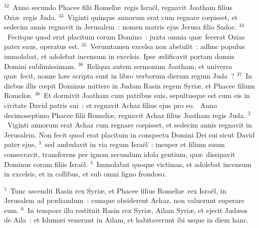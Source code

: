 ${}^{32}$~Anno secundo Phacee filii Romeli\ae\ regis Isra\"el, regnavit Joatham filius Ozi\ae\ regis Juda.
${}^{33}$~Viginti quinque annorum erat cum regnare cœpisset, et sedecim annis regnavit in Jerusalem~: nomen matris ejus Jerusa filia Sadoc.
${}^{34}$~Fecitque quod erat placitum coram Domino~: juxta omnia qu\ae\ fecerat Ozias pater suus, operatus est.
${}^{35}$~Verumtamen excelsa non abstulit~: adhuc populus immolabat, et adolebat incensum in excelsis. Ipse \ae dificavit portam domus Domini sublimissimam.
${}^{36}$~Reliqua autem sermonum Joatham, et universa qu\ae\ fecit, nonne h\ae c scripta sunt in libro verborum dierum regum Juda~?
${}^{37}$~In diebus illis cœpit Dominus mittere in Judam Rasin regem Syri\ae , et Phacee filium Romeli\ae .
${}^{38}$~Et dormivit Joatham cum patribus suis, sepultusque est cum eis in civitate David patris sui~: et regnavit Achaz filius ejus pro eo.
~Anno decimoseptimo Phacee filii Romeli\ae , regnavit Achaz filius Joatham regis Juda.
${}^{2}$~Viginti annorum erat Achaz cum regnare cœpisset, et sedecim annis regnavit in Jerusalem. Non fecit quod erat placitum in conspectu Domini Dei sui sicut David pater ejus,
${}^{3}$~sed ambulavit in via regum Isra\"el~: insuper et filium suum consecravit, transferens per ignem secundum idola gentium, qu\ae\ dissipavit Dominus coram filiis Isra\"el.
${}^{4}$~Immolabat quoque victimas, et adolebat incensum in excelsis, et in collibus, et sub omni ligno frondoso.


${}^{5}$~Tunc ascendit Rasin rex Syri\ae , et Phacee filius Romeli\ae\ rex Isra\"el, in Jerusalem ad pr\ae liandum~: cumque obsiderent Achaz, non valuerunt superare eum.
${}^{6}$~In tempore illo restituit Rasin rex Syri\ae , Ailam Syri\ae , et ejecit Jud\ae os de Aila~: et Idum\ae i venerunt in Ailam, et habitaverunt ibi usque in diem hanc.


